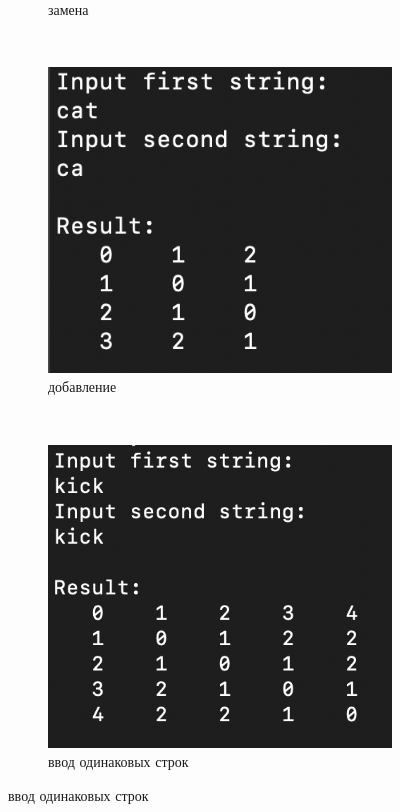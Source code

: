 \documentclass[12pt,a4paper,oneside]{report}
\begin{document}
\begin{figure}[H]
\begin{subfigure}[b]{0.3\textwidth}
		\caption{замена}
	\end{subfigure}
	~
		\begin{subfigure}[b]{0.3\textwidth}
		\includegraphics[width=\linewidth]{add}
		\caption{добавление}
	\end{subfigure}
	~
	\begin{subfigure}[b]{0.3\textwidth}
		\includegraphics[width=\linewidth]{same}
		\caption{ввод одинаковых строк}

\end{subfigure}
\end{figure}
\end{document}
